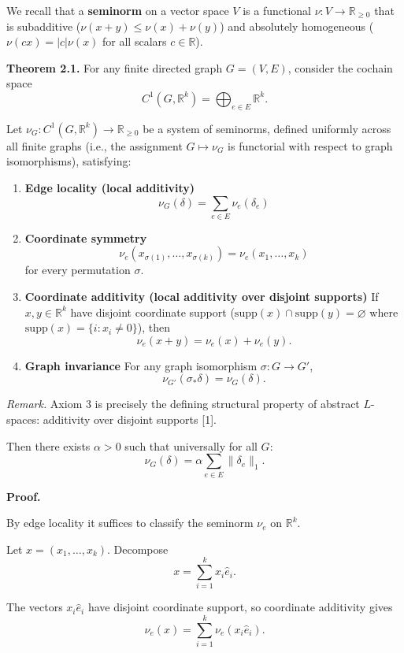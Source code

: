 \documentclass[
]{article}
\providecommand{\tightlist}{%
  \setlength{\itemsep}{0pt}\setlength{\parskip}{0pt}}
\begin{document}
We recall that a \textbf{seminorm} on a vector space \(V\) is a
functional \(\nu: V \to \mathbb{R}_{\ge0}\) that is subadditive
(\(\nu(x+y) \le \nu(x) + \nu(y)\)) and absolutely homogeneous
(\(\nu(cx) = |c|\nu(x)\) for all scalars \(c \in \mathbb{R}\)).

\textbf{Theorem 2.1.} For any finite directed graph \(G=(V,E)\),
consider the cochain space
\[ C^1(G,\mathbb{R}^k)=\bigoplus_{e\in E}\mathbb{R}^k. \]

Let \(\nu_G:C^1(G,\mathbb{R}^k)\to\mathbb{R}_{\ge0}\) be a system of
seminorms, defined uniformly across all finite graphs (i.e., the
assignment \(G \mapsto \nu_G\) is functorial with respect to graph
isomorphisms), satisfying:

\begin{enumerate}
\def\labelenumi{\arabic{enumi}.}
\tightlist
\item
  \textbf{Edge locality (local additivity)}
  \[ \nu_G(\delta)=\sum_{e\in E}\nu_e(\delta_e) \]
\item
  \textbf{Coordinate symmetry}
  \[ \nu_e(x_{\sigma(1)},\dots,x_{\sigma(k)}) = \nu_e(x_1,\dots,x_k) \]
  for every permutation \(\sigma\).
\item
  \textbf{Coordinate additivity (local additivity over disjoint
  supports)} If \(x,y\in\mathbb{R}^k\) have disjoint coordinate support
  (\(\mathrm{supp}(x) \cap \mathrm{supp}(y) = \varnothing\) where
  \(\mathrm{supp}(x) = \{i : x_i \neq 0\}\)), then
  \[ \nu_e(x+y)=\nu_e(x)+\nu_e(y). \]
\item
  \textbf{Graph invariance} For any graph isomorphism
  \(\sigma:G\to G'\), \[ \nu_{G'}(\sigma_*\delta)=\nu_G(\delta). \]
\end{enumerate}

\emph{Remark.} Axiom 3 is precisely the defining structural property of
abstract \(L\)-spaces: additivity over disjoint supports {[}1{]}.

Then there exists \(\alpha > 0\) such that universally for all \(G\):
\[ \nu_G(\delta)=\alpha\sum_{e\in E}\|\delta_e\|_1. \]

\textbf{Proof.}

By edge locality it suffices to classify the seminorm \(\nu_e\) on
\(\mathbb{R}^k\).

Let \(x=(x_1,\dots,x_k)\). Decompose \[ x=\sum_{i=1}^k x_i \hat{e}_i. \]

The vectors \(x_i \hat{e}_i\) have disjoint coordinate support, so
coordinate additivity gives
\[ \nu_e(x)=\sum_{i=1}^k\nu_e(x_i \hat{e}_i). \]
\end{document}
